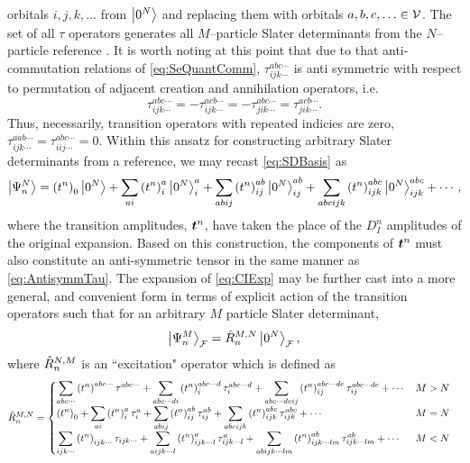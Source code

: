 orbitals $i,j,k,\ldots$ from $\left\vert 0^N \right\rangle$ and replacing them with orbitals $a,b,c,\ldots \in \mathcal{V}$. The set of all
$\tau$ operators generates all $M$--particle Slater determinants from the $N$--particle reference .
It is worth noting at this point that due to that anti-commutation relations of \cref{eq:SeQuantComm}, $\tau^{abc\cdots}_{ijk\cdots}$
is anti symmetric with respect to permutation of adjacent creation and annihilation operators, i.e.
\begin{equation}
  \label{eq:AntisymmTau}
  \tau^{abc\cdots}_{ijk\cdots} = - \tau^{acb\cdots}_{ijk\cdots} = - \tau^{abc\cdots}_{jik\cdots} = \tau^{acb\cdots}_{jik\cdots}.
\end{equation} 
Thus, necessarily, transition operators with repeated indicies are zero, $\tau^{aab\cdots}_{ijk\cdots} = \tau^{abc\cdots}_{iij\cdots} = 0$.
Within this ansatz for constructing arbitrary Slater determinants from a reference, we may recast \cref{eq:SDBasis} 
as
\begin{equation}
  \label{eq:CIExp}
  \left\vert \Psi^N_n \right\rangle = \left(t^n\right)_0\left\vert 0^N \right\rangle + \sum_{ai} \left(t^n\right)_i^a \left\vert 0^N \right\rangle_i^a + 
                   \sum_{abij} \left(t^n\right)_{ij}^{ab} \left\vert 0^N \right\rangle_{ij}^{ab} + \sum_{abcijk} \left(t^n\right)_{ijk}^{abc} \left\vert 0^N \right\rangle_{ijk}^{abc} + \cdots,
\end{equation}
where the transition amplitudes, $\boldsymbol{t}^n$, have taken the place of the $D^n_I$ amplitudes of the original expansion. Based on this
construction, the components of $\boldsymbol{t}^n$ must also constitute an anti-symmetric tensor in the same manner as \cref{eq:AntisymmTau}.
The expansion of 
\cref{eq:CIExp} may be further cast into a more general, and convenient form in terms of explicit action of the transition
operators such that for an arbitrary $M$ particle Slater determinant,
\begin{equation}
  \label{eq:ExcitationOp}
  \left\vert \Psi^M_n \right\rangle_{\mathcal{F}} = \hat{R}_n^{M,N} \left\vert 0^N \right\rangle_{\mathcal{F}},
\end{equation}
where $\hat{R}_n^{N,M}$ is an ``excitation" operator which is defined as
\begin{align}
&\hat{R}_n^{M,N} = 
  \begin{cases}
    \displaystyle \sum_{abc\cdots} \left( t^n \right)^{abc\cdots} \tau^{abc\cdots} + \sum_{abc\cdots di} \left( t^n \right)^{abc\cdots d}_i \tau^{abc\cdots d}_i +
      \sum_{abc\cdots deij} \left( t^n \right)^{abc\cdots de}_{ij} \tau^{abc\cdots de}_{ij} + \cdots & M > N \\
    \displaystyle\left( t^n \right)_0  + \sum_{ai} \left( t^n \right)^{a}_i \tau^{a}_i +
      \sum_{abij} \left( t^n \right)^{ab}_{ij} \tau^{ab}_{ij} + \sum_{abcijk} \left( t^n \right)^{abc}_{ijk} \tau^{abc}_{ijk} + \cdots & M = N \\
    \displaystyle \sum_{ijk\cdots} \left( t^n \right)_{ijk\cdots} \tau_{ijk\cdots} + \sum_{a ijk\cdots l} \left( t^n \right)^{a}_{ijk\cdots l} \tau^{a}_{ijk\cdots l} +
      \sum_{abijk\cdots lm} \left( t^n \right)^{ab}_{ijk\cdots lm} \tau^{ab}_{ijk\cdots lm} + \cdots & M < N \\
  \end{cases}
\end{align}
